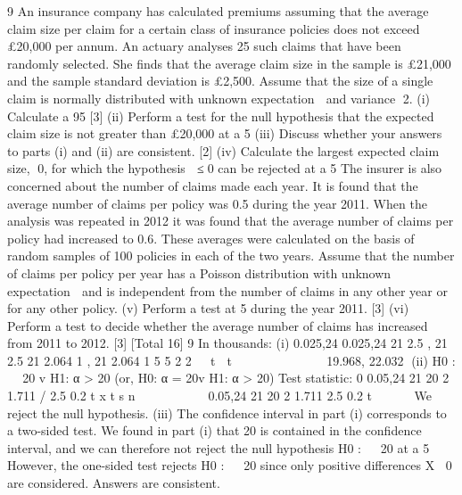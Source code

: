 \documentclass[a4paper,12pt]{article}
\begin{document}
\begin{enumerate}

9 An insurance company has calculated premiums assuming that the average claim size
per claim for a certain class of insurance policies does not exceed £20,000 per annum.
An actuary analyses 25 such claims that have been randomly selected. She finds that
the average claim size in the sample is £21,000 and the sample standard deviation is
£2,500. Assume that the size of a single claim is normally distributed with unknown
expectation  and variance 2.
(i) Calculate a 95%
[3]
(ii) Perform a test for the null hypothesis that the expected claim size is not greater
than £20,000 at a 5%
(iii) Discuss whether your answers to parts (i) and (ii) are consistent. [2]
(iv) Calculate the largest expected claim size, 0, for which the hypothesis  ≤0
can be rejected at a 5%
The insurer is also concerned about the number of claims made each year. It is found
that the average number of claims per policy was 0.5 during the year 2011. When the
analysis was repeated in 2012 it was found that the average number of claims per
policy had increased to 0.6. These averages were calculated on the basis of random
samples of 100 policies in each of the two years. Assume that the number of claims
per policy per year has a Poisson distribution with unknown expectation  and is
independent from the number of claims in any other year or for any other policy.
(v) Perform a test at 5%
during the year 2011. [3]
(vi) Perform a test to decide whether the average number of claims has increased
from 2011 to 2012. [3]
[Total 16]
9 In thousands:
  (i) 0.025,24 0.025,24
21 2.5 , 21 2.5 21 2.064 1 , 21 2.064 1
5 5 2 2
 t  t          
19.968, 22.032
(ii) H0 :   20 v H1: α > 20
(or, H0: α = 20v H1: α > 20)
Test statistic: 0
0.05,24
21 20 2 1.711
/ 2.5 0.2
t x t
s n
  
    

0.05,24
21 20 2 1.711
2.5 0.2
t

  

We reject the null hypothesis.
(iii) The confidence interval in part (i) corresponds to a two-sided test. We found
in part (i) that 20 is contained in the confidence interval, and we can therefore
not reject the null hypothesis H0 :   20 at a 5%
However, the one-sided test rejects H0 :   20 since only positive differences
X 0 are considered. Answers are consistent.

\end{enumerate}
\end{document}
